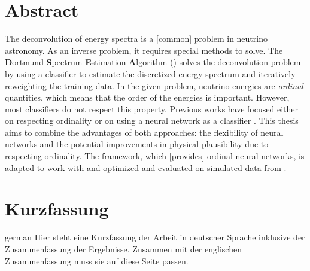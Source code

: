 \thispagestyle{plain}

\section*{Abstract}

The deconvolution of energy spectra is a [common] problem in neutrino astronomy.
As an inverse problem,
  it requires special methods to solve.
The \textbf{D}ortmund \textbf{S}pectrum \textbf{E}stimation \textbf{A}lgorithm (\dsea{}) \cite{dsea_unification}
solves the deconvolution problem
  by using a classifier to estimate the discretized energy spectrum
  and iteratively reweighting the training data.
%
In the given problem,
  neutrino energies are \emph{ordinal} quantities,
    which means that the order of the energies is important. %
However,
  most classifiers do not respect this property.
%
Previous works
have focused either
  on respecting ordinality \cite{dsea_jan}
  or on using a neural network as a classifier \cite{dsea_samuel}.
This thesis aims to combine the advantages of both approaches:
  the flexibility of neural networks
  and the potential improvements in physical plausibility
    due to respecting ordinality.
The \corn{} framework,
  which [provides] ordinal neural networks,
is adapted to work with \dsea{}
and optimized and evaluated on simulated data from \icecube{}.



\section*{Kurzfassung}
\begin{foreignlanguage}{german}
Hier steht eine Kurzfassung der Arbeit in deutscher Sprache inklusive der Zusammenfassung der
Ergebnisse.
Zusammen mit der englischen Zusammenfassung muss sie auf diese Seite passen.

\blindtext[1]
\end{foreignlanguage}

